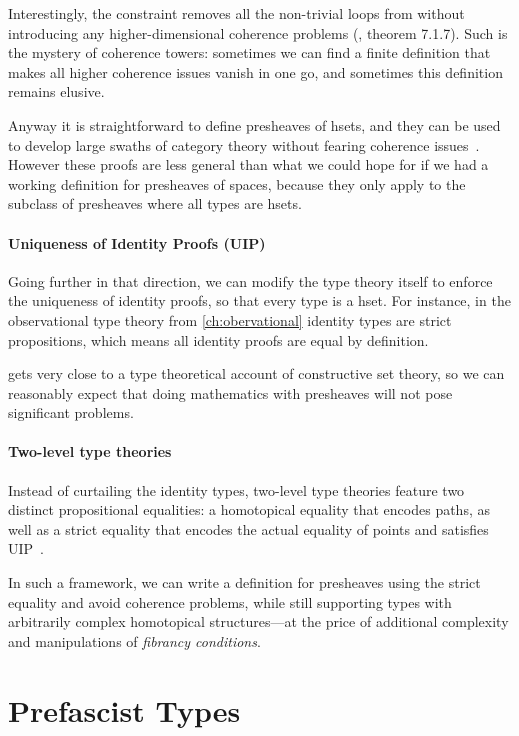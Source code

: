 Interestingly, the  constraint removes all the non-trivial 
loops from  without introducing any higher-dimensional coherence 
problems (, theorem 7.1.7). 
% 
Such is the mystery of coherence towers: sometimes we can find a finite 
definition that makes all higher coherence issues vanish in one go, and 
sometimes this definition remains elusive.

Anyway it is straightforward to define presheaves of hsets, and they can be used 
to develop large swaths of category theory without fearing coherence 
issues~. 
However these proofs are less general than what we could hope for if we had a 
working definition for presheaves of spaces, because they only apply to
the subclass of presheaves where all types are hsets.

\paragraph{Uniqueness of Identity Proofs (UIP)}
% 
Going further in that direction, we can modify the type theory itself to 
enforce the uniqueness of identity proofs, so that every type is a hset.
% 
For instance, in the observational type theory \SetoidCC from 
\cref{ch:obervational} identity types are strict propositions,
which means all identity proofs are equal by definition.

\SetoidCC gets very close to a type theoretical account of constructive set 
theory, so we can reasonably expect that doing mathematics with presheaves 
will not pose significant problems.

\paragraph{Two-level type theories}
% 
Instead of curtailing the identity types, two-level type theories 
feature two distinct propositional equalities: a homotopical equality that 
encodes paths, as well as a strict equality that encodes the actual equality
of points and satisfies UIP~.

In such a framework, we can write a definition for presheaves using the strict equality
and avoid coherence problems, while still supporting types with arbitrarily
complex homotopical structures---at the price of additional complexity
and manipulations of \emph{fibrancy conditions}.

\section{Prefascist Types}
\label{sec:prefascist}

